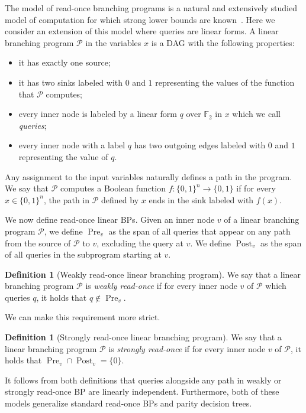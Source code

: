 \documentclass[a4paper,11pt,draft]{article}
\theoremstyle{definition}
\newtheorem{definition}[theorem]{Definition}
\theoremstyle{remark}
\DeclareMathOperator{\pre}{Pre}
\DeclareMathOperator{\post}{Post}
\newcommand{\Q}{{\{0,1\}}}
\newcommand{\bbF}{\mathbb{F}}
\newcommand{\calP}{\mathcal{P}}
\newcommand{\sreadonce}{strongly read-once}
\newcommand{\Sreadonce}{Strongly read-once}
\newcommand{\wreadonce}{weakly read-once}
\newcommand{\Wreadonce}{Weakly read-once}
\newcommand{\readonce}{read-once}
\begin{document}
The model of read-once branching programs is a natural and extensively studied model of computation for which strong lower bounds are known~\cite{DBLP:journals/tcs/SavickyZ00,DBLP:conf/icalp/AndreevBCR99}. Here we consider an extension of this model where queries are linear forms. A linear branching program $\calP$ in the variables $x$ is a DAG with the following properties:
\begin{itemize}
  \item it has exactly one source;
  \item it has two sinks labeled with $0$ and $1$ representing the values of the function that $\calP$ computes;
  \item every inner node is labeled by a linear form $q$ over $\bbF_2$ in $x$ which we call \emph{queries};
  \item every inner node with a label $q$ has two outgoing edges labeled with $0$ and $1$ representing the value of $q$.
\end{itemize}

Any assignment to the input variables naturally defines a path in the program. We say that $\calP$ computes a Boolean function $f\colon \Q^n \to \Q$ if for every $x \in \Q^n$, the path in $\calP$ defined by $x$ ends in the sink labeled with $f(x)$.

We now define \readonce{} linear BPs. Given an inner node $v$ of a linear branching program $\calP$, we define $\pre_v$ as the span of all queries that appear on any path from the source of $\calP$ to $v$, excluding the query at $v$. We define $\post_v$ as the span of all queries in the subprogram starting at $v$. 

\begin{definition}[\Wreadonce{} linear branching program]
We say that a linear branching program $\calP$ is \emph{\wreadonce} if for every inner node $v$ of $\calP$ which queries $q$, it holds that $q \not \in \pre_v$.
\end{definition}

We can make this requirement more strict.

\begin{definition}[\Sreadonce{} linear branching program]
We say that a linear branching program $\calP$ is \emph{\sreadonce} if for every inner node $v$ of $\calP$, it holds that $\pre_v \cap \post_v = \{0\}$.
\end{definition}

It follows from both definitions that queries alongside any path in weakly or strongly read-once BP are linearly independent. Furthermore, both of these models generalize standard read-once BPs and parity decision trees.
\end{document}
